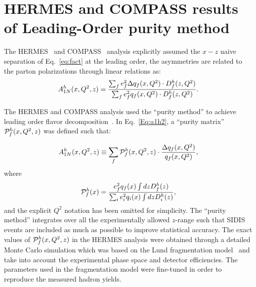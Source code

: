 \section{HERMES and COMPASS results of Leading-Order  purity method }
The HERMES~\cite{Airapetian:2004zf} and COMPASS~\cite{Alekseev:2010ub} analysis explicitly assumed the $x-z$ naive separation  of Eq.~\ref{eq:fact}
at the leading order, the asymmetries are related to the parton polarizations
through linear relations as: 
\begin{equation}
A_{1N}^h(x,Q^2,z) =  
{ \sum_f  e_f^2 \Delta q_f(x,Q^2) \cdot D_f^{h}(z, Q^2) 
\over \sum_f e_f^2 q_f(x,Q^2) \cdot D_f^{h}(z,Q^2) }.
\label{Eq:a1h2}
\end{equation} 

The HERMES and COMPASS analysis used the 
``purity method'' to achieve leading order 
flavor decomposition~\cite{purity}. In Eq.~\ref{Eq:a1h2},
a ``purity matrix'' ${\cal P}_f^h(x,Q^2,z)$ was defined such that:

\begin{equation}
A_{1N}^h(x,Q^2,z) \equiv \sum_f {\cal P}_f^h(x,Q^2,z) \cdot 
{\Delta q_f(x,Q^2) \over q_f(x,Q^2)},
\label{Eq:a1pur}
\end{equation}  
where
\begin{equation}
{\cal P}_f^h(x)= { e_f^2  q_f(x) \int dz  D_f^{h}(z) \over \sum_{i}  e_{i}^2  
q_{i}(x) \int dz  D_{i}^{h}(z) },
\end{equation}  
and the explicit $Q^2$ notation has been omitted for simplicity.
The ``purity method'' integrates over all the experimentally allowed $z$-range such 
that SIDIS events are included as much as possible to improve statistical accuracy.
The exact values of ${\cal P}_f^h(x,Q^2,z)$ in the HERMES analysis were obtained through a detailed
Monte Carlo simulation which was based on the Lund fragmentation model~\cite{lund} 
and take into account the experimental phase space and detector efficiencies. The parameters 
used in the fragmentation model were fine-tuned in order to reproduce the measured hadron yields. 
 
